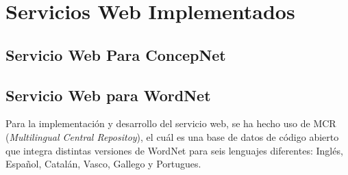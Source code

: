 \chapter{Servicios Web Implementados}
\label{cap:serviciosWebImplementados}


\section{Servicio Web Para ConcepNet}




\section{Servicio Web para WordNet}

Para la implementación y desarrollo del servicio web, se ha hecho uso de MCR (\textit{Multilingual Central Repositoy}), el cuál es una base de datos de código abierto que integra distintas versiones de WordNet para seis lenguajes diferentes: Inglés, Español, Catalán, Vasco, Gallego y Portugues. 